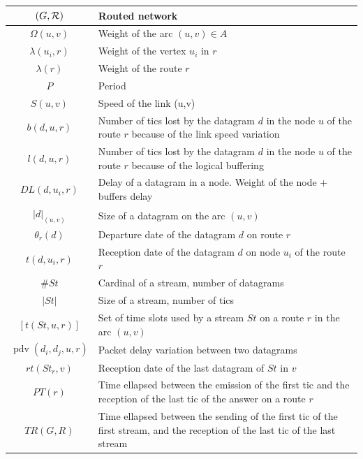 \documentclass[10pt]{article}
\DeclareMathOperator{\pdv}{pdv}
\begin{document}
      \begin{center}
   \begin{tabularx}{0.8\textwidth}{|c|X|}
    \hline
     $(G,\cal R)$ & Routed network \\
     \hline
      $\Omega(u,v)$ & Weight of the arc $(u,v) \in A$ \\
      \hline
      $\lambda(u_i,r)$ & Weight of the vertex $u_i$ in $r$\\
    \hline
    $\lambda(r)$ & Weight of the route $r$\\
    \hline
    $P$ & Period\\
    \hline
    $S(u,v)$ & Speed of the link (u,v)\\
    \hline
    $b(d,u,r)$ & Number of tics lost by the datagram $d$ in the node $u$ of the route $r$ because of the link speed variation \\
    \hline
    $l(d,u,r)$ & Number of tics lost by the datagram $d$ in the node $u$ of the route $r$ because of the logical buffering \\
    \hline
    $DL(d,u_i,r)$ & Delay of a datagram in a node. Weight of the node + buffers delay\\
    \hline
    $|d|_{(u,v)}$ & Size of a datagram on the arc $(u,v)$ \\
    \hline
    $\theta_r(d)$ & Departure date of the datagram $d$ on route $r$ \\
    \hline
    $t(d,u_i,r)$ & Reception date of the datagram $d$ on node $u_i$ of the route $r$\\
    \hline
    $\#St$ & Cardinal of a stream, number of datagrams \\
    \hline
    $|St|$ & Size of a stream, number of tics \\       
    \hline
    $ [t(St,u,r)]$ & Set of time slots used by a stream $St$ on a route $r$ in the arc $(u,v)$ \\
    \hline
    $\pdv(d_i,d_j,u,r)$ & Packet delay variation between two datagrams \\
    \hline
    $rt(St_r,v)$ & Reception date of the last datagram of $St$ in $v$ \\
    \hline 
    $PT(r)$ & Time ellapsed between the emission of the first tic and the reception of the last tic of the answer on a route $r$ \\
    \hline
    $TR(G,R)$ &  Time ellapsed between the sending of the first tic of the first stream, and the reception of the last tic of the last stream \\
    \hline
      \end{tabularx}
      \end{center}
    


	 



\end{document}
